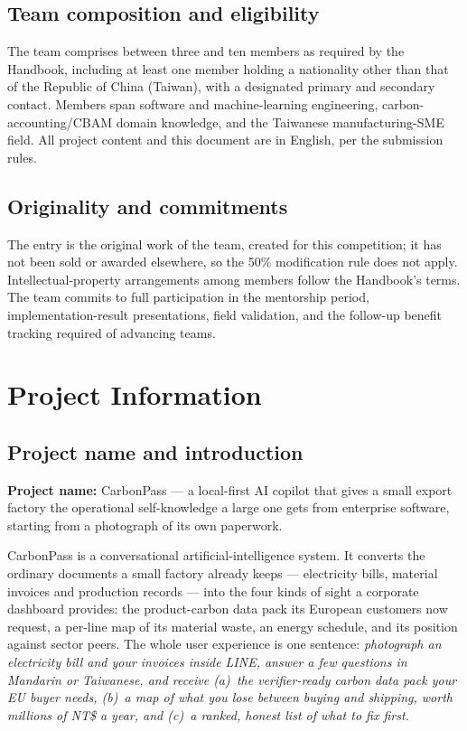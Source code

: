 \documentclass[11pt]{article}
\begin{document}
\subsection*{Team composition and eligibility}
The team comprises between three and ten members as required by the Handbook, including at least one member holding a nationality other than that of the Republic of China (Taiwan), with a designated primary and secondary contact. Members span software and machine-learning engineering, carbon-accounting/CBAM domain knowledge, and the Taiwanese manufacturing-SME field. All project content and this document are in English, per the submission rules.

\subsection*{Originality and commitments}
The entry is the original work of the team, created for this competition; it has not been sold or awarded elsewhere, so the 50\% modification rule does not apply. Intellectual-property arrangements among members follow the Handbook's terms. The team commits to full participation in the mentorship period, implementation-result presentations, field validation, and the follow-up benefit tracking required of advancing teams.

\clearpage
\section{Project Information}

\subsection{Project name and introduction}
\textbf{Project name:} CarbonPass --- a local-first AI copilot that gives a small export factory the operational self-knowledge a large one gets from enterprise software, starting from a photograph of its own paperwork.

CarbonPass is a conversational artificial-intelligence system. It converts the ordinary documents a small factory already keeps --- electricity bills, material invoices and production records --- into the four kinds of sight a corporate dashboard provides: the product-carbon data pack its European customers now request, a per-line map of its material waste, an energy schedule, and its position against sector peers. The whole user experience is one sentence: \emph{photograph an electricity bill and your invoices inside LINE, answer a few questions in Mandarin or Taiwanese, and receive (a)~the verifier-ready carbon data pack your EU buyer needs, (b)~a map of what you lose between buying and shipping, worth millions of NT\$ a year, and (c)~a ranked, honest list of what to fix first.}
\end{document}
